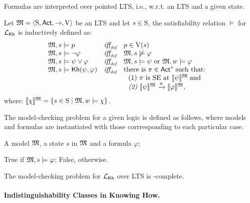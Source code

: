 Formulas are interpreted over pointed LTS, i.e., w.r.t. an LTS and a given state. 

\begin{definition} \label{def:semantics-kh}
    Let $\model = \tup{\S,\Act,\ra,\V}$ be an LTS and let $s\in\S$, the satisfiability relation $\models$ for $\Khlogic$ is inductively defined as:
    \[
    \begin{array}{l@{\ \ \ }c@{\ \ \  }l}
    \model, s \models p & \iffdef & p \in \V(s) \\
    \model, s\models \neg\varphi & \iffdef & \model, s \not\models \varphi \\
    \model, s \models \psi\vee\varphi & \iffdef & \model, s \models \psi \mbox{ or }\model, w \models \varphi \\
    \model, s \models \kh(\psi,\varphi) & \iffdef & \text{there is } \plan \in \Act^* \;\text{such that:} \\
    & & \ \ \text{\rm (1)} \ \plan \text{ is SE at }  \truthset{\model}{\psi}\; \text{and} \\
    & & \ \ \text{\em (2)} \ \truthset{\model}{\psi} \reach{\plan} \truthset{\model}{\varphi}, 
    \end{array}
    \]      where: $\truthset{\model}{\chi} = \csetsc{s\in\S}{\model,w\models\chi}$. 
\end{definition}

The model-checking problem for a given logic is defined as follows, where models and formulas are instantiated with those corrresponding to each particular case. 

\begin{description} \itemsep 0cm
    \item[Input:] A model $\model$, a state $s$ in $\model$ and a formula $\varphi$;
    \item[Output:] True if $\model,s\models\varphi$; False, otherwise.
\end{description}

\begin{proposition}
    The model-checking problem for $\Khlogic$ over LTS is \PSPACE-complete.
\end{proposition}

\paragraph{Indistinguishability Classes in Knowing How.}

